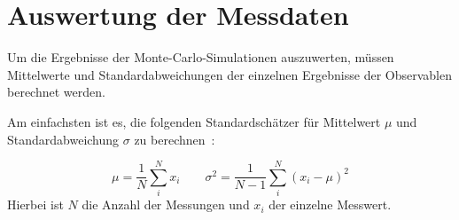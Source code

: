 	
		

	
	\section{Auswertung der Messdaten}
	\label{sec:theorieauswertung}
	Um die Ergebnisse der Monte-Carlo-Simulationen auszuwerten, müssen Mittelwerte und Standardabweichungen der einzelnen Ergebnisse der Observablen berechnet werden.
	
	Am einfachsten ist es, die folgenden Standardschätzer für Mittelwert $\mu$ und Standardabweichung $\sigma$ zu berechnen~\cite[vgl. ][S. 54 f.]{skriptcompphys}:
	
	\begin{equation}
	\mu=\frac{1}{N}\sum\limits_{i}^{N} x_i
	\qquad
	\sigma^2=\frac{1}{N-1}\sum\limits_{i}^{N}(x_i-\mu)^2
	\label{eq:standardmitteundfehler}
	\end{equation}
	Hierbei ist $N$ die Anzahl der Messungen und $x_i$ der einzelne Messwert.
	
	
	
